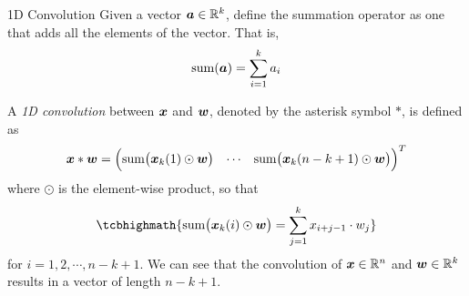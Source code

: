 %
%
%
\begin{frame}{1D Convolution}
Given a vector ${\boldsymbol a} \in {\mathord{\mathbb R}}^k$, define the summation operator as one
that adds all the elements of the vector. That is,
\begin{align*}
    \operatorname*{sum}({\boldsymbol a}) = \sum_{i=1}^k a_i
\end{align*}

A {\em 1D convolution} between ${\boldsymbol x}$ and ${\boldsymbol w}$, denoted by the asterisk symbol
$\ast$, is defined as
\begin{equation*}
    {\boldsymbol x} \ast {\boldsymbol w} = \begin{pmatrix} &&\\[-1em]
    \operatorname*{sum}\bigl({\boldsymbol x}_k(1) \odot {\boldsymbol w}\bigr) &
        \cdots &
        \operatorname*{sum}\bigl({\boldsymbol x}_k({n-k+1}) \odot {\boldsymbol w}\bigr)\\[-1em]
&& \end{pmatrix}^T
\end{equation*}
where $\odot$ is the element-wise product, so that
\begin{align}
    \tcbhighmath{
    \summ\bigl(\bx_k(i) \odot \bw\bigr) = \sum_{j=1}^k x_{i+j-1} \cdot
w_j }
\end{align}
for $i=1,2,\cdots,n-k+1$. 
We can see that the convolution of ${\boldsymbol x} \in {\mathord{\mathbb R}}^n$ and ${\boldsymbol w} \in
{\mathord{\mathbb R}}^k$ results in a vector of length $n-k+1$.
\end{frame}

